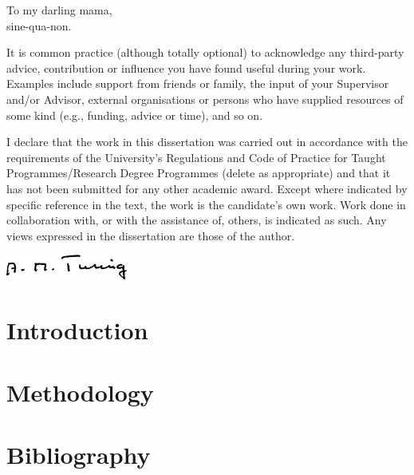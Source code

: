 \documentclass[
]{uob-thesis}
\begin{document}
\begin{dedication}
  To my darling mama,\\
  sine-qua-non.
\end{dedication}

\begin{acknowledgements}
It is common practice (although totally optional) to acknowledge any third-party
advice, contribution or influence you have found useful during your work.
Examples include support from friends or family, the input of your Supervisor
and/or Advisor, external organisations or persons who  have supplied resources
of some kind (e.g., funding, advice or time), and so on.
\end{acknowledgements}

\begin{declaration}
  I declare that the work in this dissertation was carried out in accordance
  with the requirements of the University's Regulations and Code of Practice for
  Taught Programmes/Research Degree Programmes {\color{red} (delete as
  appropriate)} and that it has not been submitted for any other academic award.
  Except where indicated by specific reference in the text, the work is the
  candidate's own work. Work done in collaboration with, or with the assistance
  of, others, is indicated as such. Any views expressed in the
  dissertation are those of the author.
  
  \vspace{2cm}

  \includegraphics[width=4cm]{sig}
\end{declaration}




\frontmatter

\tableofcontents
\listoftables
\listoffigures



\mainmatter

\chapter{Introduction}

  

\chapter{Methodology}

  



\backmatter

\chapter*{Bibliography}

\printbibliography[heading=none]
\end{document}
